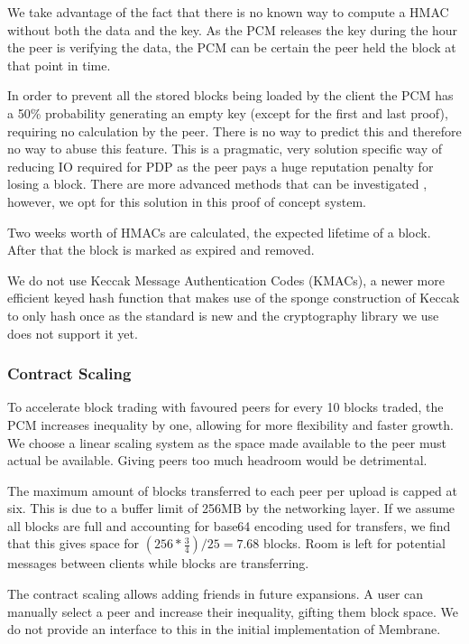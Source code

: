 \documentclass[11pt, a4paper, twoside]{report}
\begin{document}
We take advantage of the fact that there is no known way to compute a HMAC without both the data and the key. As the PCM releases the key during the hour the peer is verifying the data, the PCM can be certain the peer held the block at that point in time. \citep{ateniese2011remote}

In order to prevent all the stored blocks being loaded by the client the PCM has a 50\% probability generating an empty key (except for the first and last proof), requiring no calculation by the peer. There is no way to predict this and therefore no way to abuse this feature. This is a pragmatic, very solution specific way of reducing IO required for PDP as the peer pays a huge reputation penalty for losing a block. There are more advanced methods that can be investigated \citep*{ateniese2011remote, shacham2008compact, bowers2009proofs}, however, we opt for this solution in this proof of concept system.

Two weeks worth of HMACs are calculated, the expected lifetime of a block. After that the block is marked as expired and removed.

We do not use Keccak Message Authentication Codes (KMACs), a newer more efficient keyed hash function that makes use of the sponge construction of Keccak to only hash once \citep{kelsey2016sha} as the standard is new and the cryptography library we use does not support it yet.

\subsubsection{Contract Scaling}

To accelerate block trading with favoured peers for every 10 blocks traded, the PCM increases inequality by one, allowing for more flexibility and faster growth. We choose a linear scaling system as the space made available to the peer must actual be available. Giving peers too much headroom would be detrimental. 

The maximum amount of blocks transferred to each peer per upload is capped at six. This is due to a buffer limit of 256MB by the networking layer. If we assume all blocks are full and accounting for base64 encoding used for transfers, we find that this gives space for $(256 * \frac{3}{4}) / 25 = 7.68$ blocks. Room is left for potential messages between clients while blocks are transferring.

The contract scaling allows adding friends in future expansions. A user can manually select a peer and increase their inequality, gifting them block space. We do not provide an interface to this in the initial implementation of Membrane.
\end{document}
